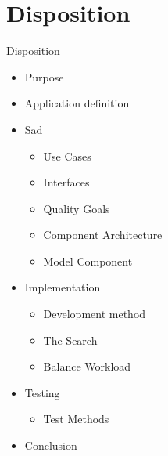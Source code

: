 \section*{Disposition}
\begin{frame}{Disposition}
\begin{itemize}
	\item Purpose
	\item Application definition
	\item Sad
	\begin{itemize}
		\item Use Cases
		\item Interfaces
		\item Quality Goals
		\item Component Architecture
		\item Model Component	
	\end{itemize}
	\item Implementation
	\begin{itemize}
		\item Development method
		\item The Search
		\item Balance Workload
	\end{itemize}	
	\item Testing
	\begin{itemize}
		\item Test Methods
	\end{itemize}
	\item Conclusion
\end{itemize}
\end{frame}